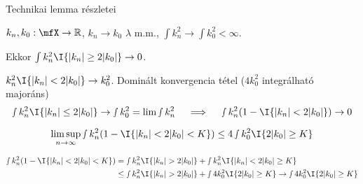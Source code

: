 \documentclass[aspectratio=169,notheorems,9pt,\option]{beamer}
\begin{document}
\begin{frame}{Technikai lemma részletei} 
  \begin{proposition}
    $k_n,k_0:\mfX\to\real$,
    $k_n\to k_0$ $\lambda$ m.m., 
    $\int k_n^2\to\int k_0^2<\infty$.
    
    Ekkor $\int k^2_n\I{\abs{k_n}\geq 2\abs{k_0}}\to0$.
  \end{proposition}
  \continue
  $k^2_n\I{\abs{k_n}< 2\abs{k_0}}\to k_0^2$. Dominált konvergencia tétel ($4k_0^2$ integrálható majoráns)
    \begin{displaymath}
      \smallint k^2_n\I{\abs{k_n}\leq 2\abs{k_0}} \to\smallint k_0^2=\lim\smallint k_n^2 
      \quad\implies\quad 
      \smallint k_n^2(1-\I{\abs{k_n}<2\abs{k_0}})\to0 
    \end{displaymath}
  \pause
  \begin{corollary}
    \begin{displaymath}
      \limsup_{n\to\infty} \smallint k^2_n(1-\I{\abs{k_n}<2\abs{k_0}<K}) \leq 4\smallint k_0^2\I{2\abs{k_0}\geq K}
    \end{displaymath}
  \end{corollary}
  \begin{align*}
    \smallint k^2_n(1-\I{\abs{k_n}<2\abs{k_0}<K})
    &= \smallint k_n^2\I{\abs{k_n}>2\abs{k_0}}+\smallint k_n^2\I{\abs{k_n}<2\abs{k_0}\geq K}\\
    &\leq \smallint k_n^2\I{\abs{k_n}>2\abs{k_0}}+\smallint 4k_0^2\I{2\abs{k_0}\geq K}
    \to \smallint 4 k_0^2\I{2\abs{k_0}\geq K}
  \end{align*}
\end{frame}
\end{document}
